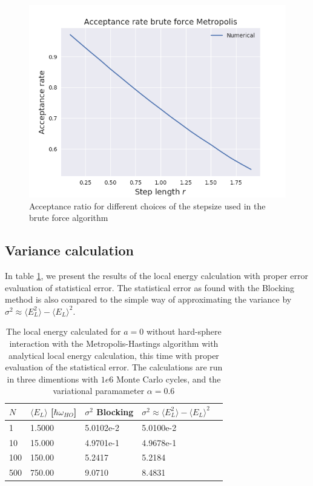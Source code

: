 \documentclass[norsk,a4paper,12pt]{article}
\begin{document}
\begin{figure} [H]
	\centering
	\includegraphics[scale=0.65]{images/acceptance_BF.png}
	\caption{Acceptance ratio for different choices of the stepsize used in the brute force algorithm}
	\label{fig:acceptance_BF_stepsize}
\end{figure} 

 \subsection{Variance calculation}

In table \ref{tab:variance_analysis}, we present the results of the local energy calculation with proper error evaluation of statistical error. The statistical error as found with the Blocking method is also compared to the simple way of approximating the variance by $\sigma^2 \approx \langle E_L^2 \rangle - \langle E_L \rangle^2$. 

\begin{table} [H]
	\caption{The local energy calculated for $a=0$  without hard-sphere interaction with the Metropolis-Hastings algorithm with analytical local energy calculation, this time with proper evaluation of the statistical error.  The calculations are run in three dimentions with $1e6$ Monte Carlo cycles, and the variational paramameter $\alpha=0.6$}
	\begin{tabularx}{\textwidth}{X|XXXX} \hline
		\label{tab:variance_analysis}
		$N$ & $\langle E_L\rangle$ [$\hbar\omega_{HO}$] & $\sigma^2$ Blocking & $\sigma^2 \approx \langle E_L^2 \rangle - \langle E_L \rangle^2$ \\ \hline
				1 & 1.5000 & 5.0102e-2  & 5.0100e-2 \\
				10 & 15.000 & 4.9701e-1 & 4.9678e-1  \\
				100 & 150.00 & 5.2417 & 5.2184\\
				500 & 750.00 & 9.0710 & 8.4831 \\ \hline
	\end{tabularx}
\end{table}
\end{document}
